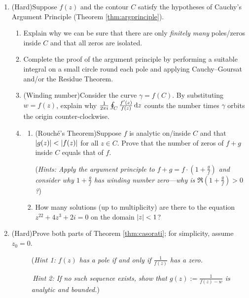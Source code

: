 \begin{exercises}
\begin{enumerate}
	  		  
	  \item (Hard)\lstsp Suppose $f(z)$ and the contour $C$ satisfy the hypotheses of Cauchy's Argument Principle (Theorem \ref{thm:argprinciple}).
	  \begin{enumerate}
	    \item Explain why we can be sure that there are only \emph{finitely many} poles/zeros inside $C$ and that all zeros are isolated.
	    \item Complete the proof of the argument principle by performing a suitable integral on a small circle round each pole and applying Cauchy--Goursat and/or the Residue Theorem. 
	    \item (Winding number)\lstsp Consider the curve $\gamma=f(C)$. By substituting $w=f(z)$, explain why $\frac 1{2\pi i}\oint_C\frac{f'(z)}{f(z)}\,{\mathrm{d} z}$ counts the number times $\gamma$ orbits the origin counter-clockwise.
	    \item\begin{enumerate}
	      \item (Rouché's Theorem)\lstsp Suppose $f$ is analytic on/inside $C$ and that $\left| g(z)\right|<\left| f(z)\right|$ for all $z\in C$. Prove that the number of zeros of $f+g$ inside $C$ equals that of $f$.\par
	    	(\emph{Hints: Apply the argument principle to $f+g=f\cdot(1+\frac gf)$ and consider why $1+\frac gf$ has winding number zero---why is $\Re(1+\frac gf)> 0$?})
	    	\item %
	    	How many solutions (up to multiplicity) are there to the equation $z^{22}+4z^3+2i=0$ on the domain $\left| z\right|<1$?
	    \end{enumerate}
	  \end{enumerate}
	
	
		\item (Hard)\lstsp Prove both parts of Theorem \ref{thm:casorati}; for simplicity, assume $z_0=0$.
		\begin{description}  	
	  	\item[](\emph{Hint 1: $f(z)$ has a pole if and only if $\frac 1{f(z)}$ has a zero.}
	  	\item[]\,\emph{Hint 2: If no such sequence exists, show that $g(z):=\frac 1{f(z)-w}$ is analytic and bounded.})
		\end{description}
		
	\end{enumerate}
\end{exercises}


